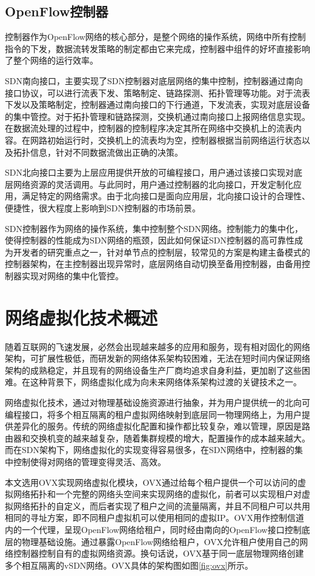 \subsection{OpenFlow控制器}
控制器作为OpenFlow网络的核心部分，是整个网络的操作系统，网络中所有控制指令的下发，数据流转发策略的制定都由它来完成，控制器中组件的好坏直接影响了整个网络的运行效率。

SDN南向接口，主要实现了SDN控制器对底层网络的集中控制，控制器通过南向接口协议，可以进行流表下发、策略制定、链路探测、拓扑管理等功能。对于流表下发以及策略制定，控制器通过南向接口的下行通道，下发流表，实现对底层设备的集中管控。对于拓扑管理和链路探测，交换机通过南向接口上报网络信息实现。在数据流处理的过程中，控制器的控制程序决定其所在网络中交换机上的流表内容。在网路初始运行时，交换机上的流表均为空，控制器根据当前网络运行状态以及拓扑信息，针对不同数据流做出正确的决策。

SDN北向接口主要为上层应用提供开放的可编程接口\cite{SDN-4}，用户通过该接口实现对底层网络资源的灵活调用。与此同时，用户通过控制器的北向接口，开发定制化应用，满足特定的网络需求。由于北向接口是面向应用层，北向接口设计的合理性、便捷性，很大程度上影响到SDN控制器的市场前景。

SDN控制器作为网络的操作系统，集中控制整个SDN网络。控制能力的集中化，使得控制器的性能成为SDN网络的瓶颈，因此如何保证SDN控制器的高可靠性成为开发者的研究重点之一，针对单节点的控制层，较常见的方案是构建主备模式的控制器架构，在主控制器出现异常时，底层网络自动切换至备用控制器，由备用控制器实现对网络的集中化管控。

\section{网络虚拟化技术概述}
随着互联网的飞速发展，必然会出现越来越多的应用和服务，现有相对固化的网络架构，可扩展性极低，而研发新的网络体系架构较困难，无法在短时间内保证网络架构的成熟稳定，并且现有的网络设备生产厂商均追求自身利益，更加剧了这些困难。在这种背景下，网络虚拟化成为向未来网络体系架构过渡的关键技术之一。

网络虚拟化技术\cite{Virtual-1}，通过对物理基础设施资源进行抽象，并为用户提供统一的北向可编程接口，将多个相互隔离的租户虚拟网络映射到底层同一物理网络上，为用户提供差异化的服务。传统的网络虚拟化配置和操作都比较复杂，难以管理，原因是路由器和交换机变的越来越复杂，随着集群规模的增大，配置操作的成本越来越大。而在SDN架构下，网络虚拟化的实现变得容易很多，在SDN网络中，控制器的集中控制使得对网络的管理变得灵活、高效。

本文选用OVX实现网络虚拟化模块，OVX通过给每个租户提供一个可以访问的虚拟网络拓扑和一个完整的网络头空间来实现网络的虚拟化，前者可以实现租户对虚拟网络拓扑的自定义，而后者实现了租户之间的流量隔离，并且不同租户可以共用相同的寻址方案，即不同租户虚拟机可以使用相同的虚拟IP。OVX用作控制信道内的一个代理，呈现OpenFlow网络给租户，同时经由南向的OpenFlow接口控制底层的物理基础设施。通过暴露OpenFlow网络给租户，OVX允许租户使用自己的网络控制器控制自有的虚拟网络资源。换句话说，OVX基于同一底层物理网络创建多个相互隔离的vSDN网络\cite{OVX-2}。OVX具体的架构图如图\ref{fig:ovx}所示。

